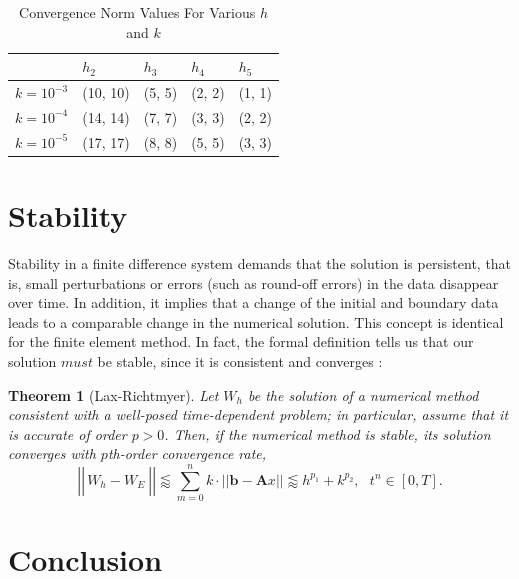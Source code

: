 \documentclass[12pt]{article}
\newtheorem{theorem}{Theorem}
\begin{document}
\begin{table}[H]
	\caption{Convergence Norm Values For Various $h$ and $k$}\label{tab:converg_rates}
	\centering
	\begin{tabular}{|l|l|l|l|l|}
		\hline
		            & $h_2$    & $h_3$  & $h_4$    & $h_5$  \\ \hline
		$k=10^{-3}$ & (10, 10) & (5, 5) & (2, 2)   & (1, 1) \\ \hline
		$k=10^{-4}$ & (14, 14) & (7, 7) & (3, 3)   & (2, 2) \\ \hline
		$k=10^{-5}$ & (17, 17) & (8, 8) & (5, 5)   & (3, 3) \\ \hline
	\end{tabular}
\end{table}












\section{Stability}

Stability in a finite difference system demands that the solution is persistent, that is, small perturbations or errors (such as round-off errors) in the data disappear over time. In addition, it implies that a change of the initial and boundary data leads to a comparable change in the numerical solution. This concept is identical for the finite element method. In fact, the formal definition tells us that our solution $must$ be stable, since it is consistent and converges \cite{Tadmor2012}:

\begin{theorem}[Lax-Richtmyer]
	Let $W_h$ be the solution of a numerical method consistent with a well-posed time-dependent problem; in particular, assume that it is accurate of order $p>0$. Then, if the numerical method is stable, its solution converges with $p$th-order convergence rate,
	$$\left|\left|\frac{}{} W_h - W_E~\right|\right| \lessapprox \sum_{m=0}^n k\cdot ||\textbf{b}-\textbf{A}x|| \lessapprox h^{p_1} + k^{p_2}, ~~~t^n\in[0,T].$$
\end{theorem}

\section{Conclusion}
\end{document}
